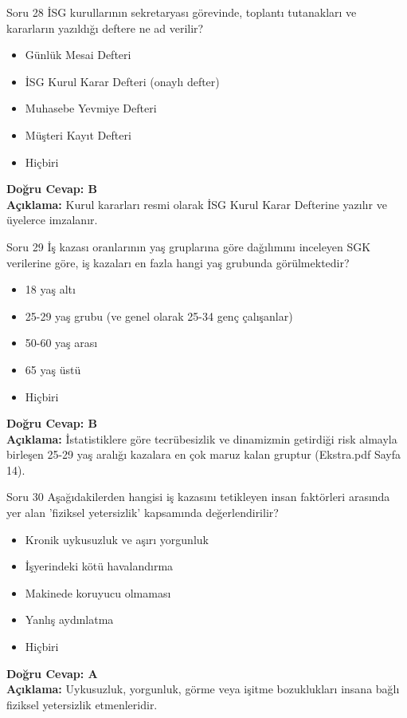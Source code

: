 \documentclass[12pt,a4paper]{article}
\begin{document}
\begin{testcard}{Soru 28}
    İSG kurullarının sekretaryası görevinde, toplantı tutanakları ve kararların yazıldığı deftere ne ad verilir?
    \begin{itemize}
        \item[A)] Günlük Mesai Defteri
        \item[B)] İSG Kurul Karar Defteri (onaylı defter)
        \item[C)] Muhasebe Yevmiye Defteri
        \item[D)] Müşteri Kayıt Defteri
        \item[E)] Hiçbiri
    \end{itemize}
    \tcblower
    \textbf{Doğru Cevap: B} \\
    \textbf{Açıklama:} Kurul kararları resmi olarak İSG Kurul Karar Defterine yazılır ve üyelerce imzalanır.
\end{testcard}

\begin{testcard}{Soru 29}
    İş kazası oranlarının yaş gruplarına göre dağılımını inceleyen SGK verilerine göre, iş kazaları en fazla hangi yaş grubunda görülmektedir?
    \begin{itemize}
        \item[A)] 18 yaş altı
        \item[B)] 25-29 yaş grubu (ve genel olarak 25-34 genç çalışanlar)
        \item[C)] 50-60 yaş arası
        \item[D)] 65 yaş üstü
        \item[E)] Hiçbiri
    \end{itemize}
    \tcblower
    \textbf{Doğru Cevap: B} \\
    \textbf{Açıklama:} İstatistiklere göre tecrübesizlik ve dinamizmin getirdiği risk almayla birleşen 25-29 yaş aralığı kazalara en çok maruz kalan gruptur (Ekstra.pdf Sayfa 14).
\end{testcard}

\begin{testcard}{Soru 30}
    Aşağıdakilerden hangisi iş kazasını tetikleyen insan faktörleri arasında yer alan 'fiziksel yetersizlik' kapsamında değerlendirilir?
    \begin{itemize}
        \item[A)] Kronik uykusuzluk ve aşırı yorgunluk
        \item[B)] İşyerindeki kötü havalandırma
        \item[C)] Makinede koruyucu olmaması
        \item[D)] Yanlış aydınlatma
        \item[E)] Hiçbiri
    \end{itemize}
    \tcblower
    \textbf{Doğru Cevap: A} \\
    \textbf{Açıklama:} Uykusuzluk, yorgunluk, görme veya işitme bozuklukları insana bağlı fiziksel yetersizlik etmenleridir.
\end{testcard}
\end{document}

